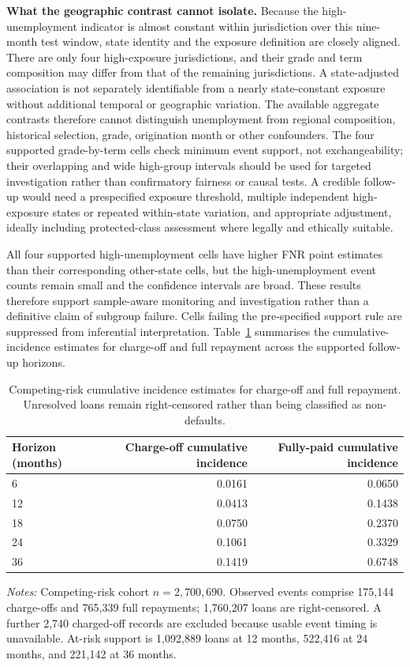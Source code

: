 \documentclass[10pt]{article}
\begin{document}
\noindent\textbf{What the geographic contrast cannot isolate.} Because the high-unemployment indicator is almost constant within jurisdiction over this nine-month test window, state identity and the exposure definition are closely aligned. There are only four high-exposure jurisdictions, and their grade and term composition may differ from that of the remaining jurisdictions. A state-adjusted association is not separately identifiable from a nearly state-constant exposure without additional temporal or geographic variation. The available aggregate contrasts therefore cannot distinguish unemployment from regional composition, historical selection, grade, origination month or other confounders. The four supported grade-by-term cells check minimum event support, not exchangeability; their overlapping and wide high-group intervals should be used for targeted investigation rather than confirmatory fairness or causal tests. A credible follow-up would need a prespecified exposure threshold, multiple independent high-exposure states or repeated within-state variation, and appropriate adjustment, ideally including protected-class assessment where legally and ethically suitable.

All four supported high-unemployment cells have higher FNR point estimates than their corresponding other-state cells, but the high-unemployment event counts remain small and the confidence intervals are broad. These results therefore support sample-aware monitoring and investigation rather than a definitive claim of subgroup failure. Cells failing the pre-specified support rule are suppressed from inferential interpretation. Table~\ref{tab:competing_risk} summarises the cumulative-incidence estimates for charge-off and full repayment across the supported follow-up horizons.



\begin{table}[!ht]
\centering
\caption{Competing-risk cumulative incidence estimates for charge-off and full repayment. Unresolved loans remain right-censored rather than being classified as non-defaults.}
\label{tab:competing_risk}
\begin{tabular}{lrr}
\toprule
Horizon (months) & Charge-off cumulative incidence & Fully-paid cumulative incidence \\
\midrule
6  & 0.0161 & 0.0650 \\
12 & 0.0413 & 0.1438 \\
18 & 0.0750 & 0.2370 \\
24 & 0.1061 & 0.3329 \\
36 & 0.1419 & 0.6748 \\
\bottomrule
\end{tabular}

\vspace{3pt}
{\footnotesize \textit{Notes:} Competing-risk cohort $n=2{,}700{,}690$. Observed events comprise 175,144 charge-offs and 765,339 full repayments; 1,760,207 loans are right-censored. A further 2,740 charged-off records are excluded because usable event timing is unavailable. At-risk support is 1,092,889 loans at 12 months, 522,416 at 24 months, and 221,142 at 36 months.}
\end{table}
\end{document}
